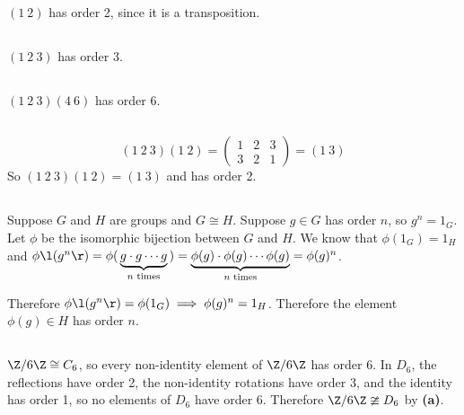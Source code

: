 \documentclass[a4paper]{article}
\begin{document}

\subsection{}

$(1\ 2)$ has order 2, since it is a transposition.

\subsection{}

$(1\ 2\ 3)$ has order 3.

\subsection{}

$(1\ 2\ 3)(4\ 6)$ has order 6.

\subsection{}

$$(1\ 2\ 3)(1\ 2) = \begin{pmatrix}1 & 2 & 3\\ 3 & 2 & 1\end{pmatrix} = (1\ 3)$$
So $(1\ 2\ 3)(1\ 2) = (1\ 3)$ and has order 2.

\renewcommand{\thesubsection}{Q\arabic{section}~(\alph{subsection})}

\subsection{}

Suppose $G$ and $H$ are groups and $G \cong H$. Suppose $g \in G$ has order $n$, so $g^n = 1_G$. Let $\phi$ be the isomorphic bijection between $G$ and $H$. We know that $\phi(1_G) = 1_H$ and $\phi\l(g^n\r) = \phi(\, \underbrace{g \cdot g \cdots g}_{n \text{ times}} \,) = \underbrace{\phi(g) \cdot \phi(g) \cdots \phi(g)}_{n \text{ times}} = \phi(g)^n$.

Therefore $\phi\l( g^n \r) = \phi(1_G) \implies \phi(g)^n = 1_H$. Therefore the element $\phi(g) \in H$ has order $n$.

\subsection{}

$\Z / 6\Z \cong C_6$, so every non-identity element of $\Z / 6\Z$ has order 6. In $D_6$, the reflections have order 2, the non-identity rotations have order 3, and the identity has order 1, so no elements of $D_6$ have order 6. Therefore $\Z / 6\Z \ncong D_6$ by \textbf{(a)}.
\end{document}
